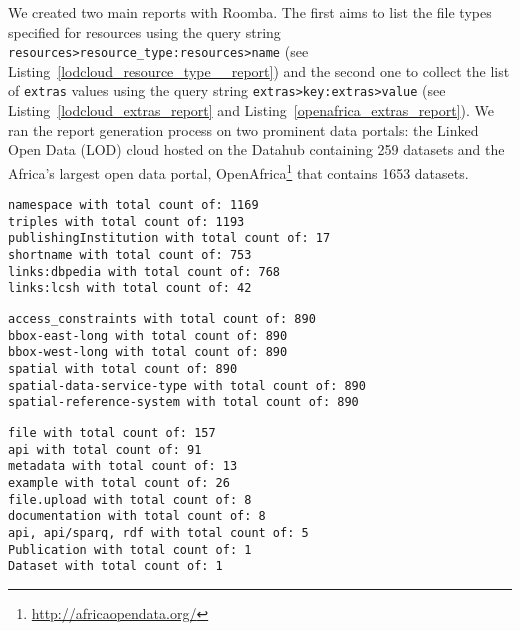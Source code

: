 We created two main reports with Roomba. The first aims to list the file types specified for resources using the query string \texttt{resources>resource\_type:resources>name} (see Listing~\ref{lodcloud_resource_type__report}) and the second one to collect the list of \texttt{extras} values using the query string \texttt{extras>key:extras>value} (see Listing~\ref{lodcloud_extras_report} and Listing~\ref{openafrica_extras_report}). We ran the report generation process on two prominent data portals: the Linked Open Data (LOD) cloud hosted on the Datahub containing 259 datasets and the Africa's largest open data portal, OpenAfrica\footnote{\url{http://africaopendata.org/}} that contains 1653 datasets.

\begin{lstlisting}
namespace with total count of: 1169
triples with total count of: 1193
publishingInstitution with total count of: 17
shortname with total count of: 753
links:dbpedia with total count of: 768
links:lcsh with total count of: 42
\end{lstlisting}

\begin{lstlisting}
access_constraints with total count of: 890
bbox-east-long with total count of: 890
bbox-west-long with total count of: 890
spatial with total count of: 890
spatial-data-service-type with total count of: 890
spatial-reference-system with total count of: 890
\end{lstlisting}

\begin{lstlisting}
file with total count of: 157
api with total count of: 91
metadata with total count of: 13
example with total count of: 26
file.upload with total count of: 8
documentation with total count of: 8
api, api/sparq, rdf with total count of: 5
Publication with total count of: 1
Dataset with total count of: 1
\end{lstlisting}

